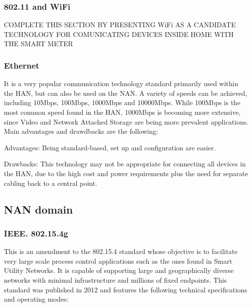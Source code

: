 \documentclass[11pt,draftclsnofoot,onecolumn]{IEEEtran}
\begin{document}
 
%

\subsubsection{802.11 and WiFi}
COMPLETE THIS SECTION BY PRESENTING WiFi AS A CANDIDATE TECHNOLOGY FOR COMUNICATING DEVICES INSIDE HOME WITH THE SMART METER

\subsubsection{Ethernet}\label{ethernetl}

It is a very popular communication technology standard primarily used within the HAN, but can also be used on the NAN. A variety of speeds can be achieved, including 10Mbps, 100Mbps, 1000Mbps and 10000Mbps. While 100Mbps is the most common speed found in the HAN, 1000Mbps is becoming more extensive, since Video and Network Attached Storage are being more prevalent applications. Main advantages and drawdbacks are the following:

Advantages: Being standard-based, set up and configuration are easier.

Drawbacks: This technology may not be appropriate for connecting all devices in the HAN, due to the high cost and power requirements plus the need for separate cabling back to a central point.

\subsection{NAN domain}

\subsubsection{IEEE. 802.15.4g}\label{tech::802154g}

This is an amendment to the 802.15.4 standard whose objective is to facilitate very large scale process control applications such as the ones found in Smart Utility Networks. It is capable of supporting large and geographically diverse networks with minimal infrastructure and millions of fixed endpoints. This standard was published in 2012 and features the following technical specifications and operating modes:
\end{document}
